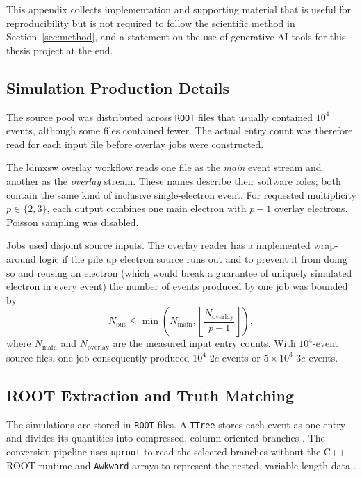 This appendix collects implementation and supporting material that is useful
for reproducibility but is not required to follow the scientific method in
Section~\ref{sec:method}, and a statement on the use of generative AI tools for this thesis project at the end.

\subsection{Simulation Production Details}
\label{sec:appendix_overlay}

The source pool was distributed across \texttt{ROOT} files that usually
contained \(10^4\) events, although some files contained fewer. The actual
entry count was therefore read for each input file before overlay jobs were
constructed.

The \gls{ldmxsw} overlay workflow reads one file as the \emph{main} event
stream and another as the \emph{overlay} stream. These names describe their
software roles; both contain the same kind of inclusive single-electron event.
For requested multiplicity \(p\in\{2,3\}\), each output combines one main
electron with \(p-1\) overlay electrons. Poisson sampling was disabled.

Jobs used disjoint source inputs. The overlay reader has a implemented wrap-around logic if the pile up electron source runs out and to prevent it from doing so and reusing an electron (which would break a guarantee of uniquely simulated electron in every event) the number of events produced by one job was bounded by
\begin{equation}
    N_{\mathrm{out}}
    \leq
    \min\left(
        N_{\mathrm{main}},
        \left\lfloor
            \frac{N_{\mathrm{overlay}}}{p-1}
        \right\rfloor
    \right),
    \label{eq:appendix_overlay_limit}
\end{equation}
where \(N_{\mathrm{main}}\) and \(N_{\mathrm{overlay}}\) are the measured
input entry counts. With \(10^4\)-event source files, one job consequently
produced \(10^4\) \(2e\) events or \(5\times10^3\) \(3e\) events.

\subsection{ROOT Extraction and Truth Matching}
\label{sec:appendix_root_conversion}

The simulations are stored in \texttt{ROOT} files. A \texttt{TTree} stores
each event as one entry and divides its quantities into compressed,
column-oriented branches \cite{root_about,root_ttree}. The
conversion pipeline uses \texttt{uproot} to read the selected branches without
the C++ ROOT runtime and \texttt{Awkward} arrays to represent the nested,
variable-length data \cite{uproot_docs,awkward_docs}.

